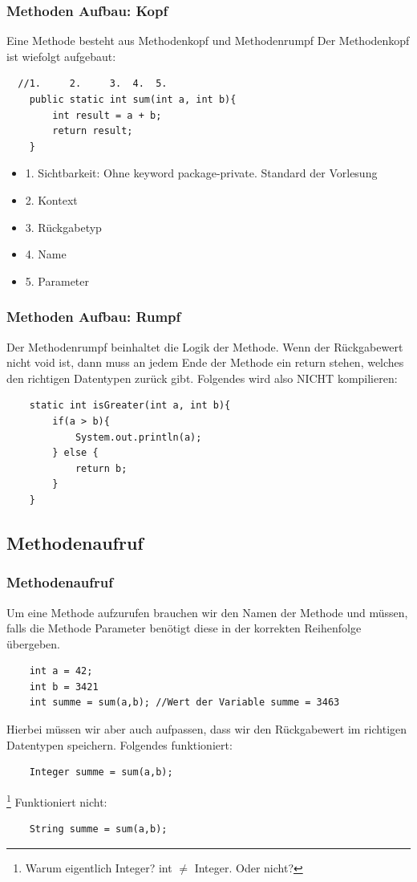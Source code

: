 \begin{frame}[fragile]
\frametitle{Methoden Aufbau: Kopf}
Eine Methode besteht aus Methodenkopf und Methodenrumpf
Der Methodenkopf ist wiefolgt aufgebaut:
\begin{lstlisting}
  //1.     2.     3.  4.  5. 
    public static int sum(int a, int b){
        int result = a + b;
        return result;
    }
\end{lstlisting}
\begin{itemize}
    \item 1. Sichtbarkeit: Ohne keyword package-private. Standard der Vorlesung
    \item 2. Kontext
    \item 3. Rückgabetyp
    \item 4. Name
    \item 5. Parameter
\end{itemize}
\end{frame}
\begin{frame}[fragile]
\frametitle{Methoden Aufbau: Rumpf}
Der Methodenrumpf beinhaltet die Logik der Methode. Wenn der Rückgabewert nicht void ist, dann muss an jedem Ende der Methode ein return stehen, welches den richtigen Datentypen zurück gibt. Folgendes wird also NICHT kompilieren:
\begin{lstlisting}
    static int isGreater(int a, int b){
        if(a > b){
            System.out.println(a);   
        } else {
            return b;
        }
    }
\end{lstlisting}
\end{frame}

\subsection{Methodenaufruf}
\begin{frame}[fragile]
\frametitle{Methodenaufruf}
Um eine Methode aufzurufen brauchen wir den Namen der Methode und müssen, falls die Methode Parameter benötigt diese in der korrekten Reihenfolge übergeben.
\begin{lstlisting}
    int a = 42;
    int b = 3421
    int summe = sum(a,b); //Wert der Variable summe = 3463
\end{lstlisting}
Hierbei müssen wir aber auch aufpassen, dass wir den Rückgabewert im richtigen Datentypen speichern. Folgendes funktioniert:
\begin{lstlisting}
    Integer summe = sum(a,b);
\end{lstlisting}\footnote{Warum eigentlich Integer? int $\ne$ Integer. Oder nicht?}
Funktioniert nicht:
\begin{lstlisting}
    String summe = sum(a,b);
\end{lstlisting}
\end{frame}

